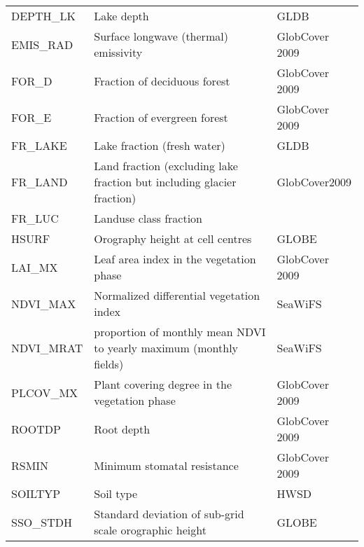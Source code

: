\begin{longtable}{p{2.5cm}p{8.5cm}p{3.3cm}}
  DEPTH\_LK                             & Lake depth                                      &        GLDB               \\
  EMIS\_RAD                             & Surface longwave (thermal) emissivity           &        GlobCover 2009     \\               
  FOR\_D                                & Fraction of deciduous forest                    &        GlobCover 2009     \\
  FOR\_E                                & Fraction of evergreen forest                    &        GlobCover 2009     \\
  FR\_LAKE                              & Lake fraction (fresh water)                     &        GLDB               \\                     
  FR\_LAND                              & Land fraction (excluding lake fraction but including glacier fraction) & GlobCover2009   \\
  FR\_LUC                               & Landuse class fraction                          &                           \\
  HSURF                                 & Orography height at cell centres                &        GLOBE              \\
  LAI\_MX                               & Leaf area index in the vegetation phase         &        GlobCover 2009     \\
  NDVI\_MAX                             & Normalized differential vegetation index        &        SeaWiFS            \\
  NDVI\_MRAT                            & proportion of monthly mean NDVI to yearly maximum (monthly fields)&  SeaWiFS \\
  PLCOV\_MX                             & Plant covering degree in the vegetation phase   &        GlobCover 2009     \\
  ROOTDP                                & Root depth                                      &        GlobCover 2009     \\
  RSMIN                                 & Minimum stomatal resistance                     &        GlobCover 2009     \\
  SOILTYP                               & Soil type                                       &        HWSD               \\
  SSO\_STDH                             & Standard deviation of sub-grid scale orographic height  &   GLOBE           \\

\end{longtable}
